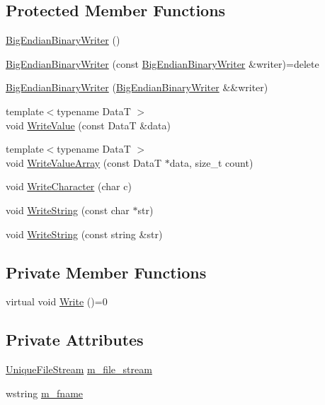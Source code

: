 \subsection*{Protected Member Functions}
\begin{DoxyCompactItemize}
\item 
\hyperlink{classmage_1_1_big_endian_binary_writer_ac0917b684913834577d4850269a6c09a}{Big\+Endian\+Binary\+Writer} ()
\item 
\hyperlink{classmage_1_1_big_endian_binary_writer_aafe65752342b2740e7293878ae469d9f}{Big\+Endian\+Binary\+Writer} (const \hyperlink{classmage_1_1_big_endian_binary_writer}{Big\+Endian\+Binary\+Writer} \&writer)=delete
\item 
\hyperlink{classmage_1_1_big_endian_binary_writer_a9b20aeebc41030d173cb44067665adb0}{Big\+Endian\+Binary\+Writer} (\hyperlink{classmage_1_1_big_endian_binary_writer}{Big\+Endian\+Binary\+Writer} \&\&writer)
\item 
{\footnotesize template$<$typename DataT $>$ }\\void \hyperlink{classmage_1_1_big_endian_binary_writer_a30edcc0ad823fc8b4f8c51107f11405a}{Write\+Value} (const DataT \&data)
\item 
{\footnotesize template$<$typename DataT $>$ }\\void \hyperlink{classmage_1_1_big_endian_binary_writer_a70459f96b5389052d6e090e124c5468b}{Write\+Value\+Array} (const DataT $\ast$data, size\+\_\+t count)
\item 
void \hyperlink{classmage_1_1_big_endian_binary_writer_a869eff3f6e0666406bd5470af3e02096}{Write\+Character} (char c)
\item 
void \hyperlink{classmage_1_1_big_endian_binary_writer_a1a62be10de26eb77e1812e6807eb4c02}{Write\+String} (const char $\ast$str)
\item 
void \hyperlink{classmage_1_1_big_endian_binary_writer_a0cbee156086deb8999e609a2b355ff0e}{Write\+String} (const string \&str)
\end{DoxyCompactItemize}
\subsection*{Private Member Functions}
\begin{DoxyCompactItemize}
\item 
virtual void \hyperlink{classmage_1_1_big_endian_binary_writer_ae6ee6613e629971502324cffc944795d}{Write} ()=0
\end{DoxyCompactItemize}
\subsection*{Private Attributes}
\begin{DoxyCompactItemize}
\item 
\hyperlink{namespacemage_a0ee1bd45ad7dbb3dc8c8e1770e3538d4}{Unique\+File\+Stream} \hyperlink{classmage_1_1_big_endian_binary_writer_ad2cdbdca429d6c351a57b51d175ffb55}{m\+\_\+file\+\_\+stream}
\item 
wstring \hyperlink{classmage_1_1_big_endian_binary_writer_a5bf83b685bfce080f55458bdca2e698a}{m\+\_\+fname}
\end{DoxyCompactItemize}


